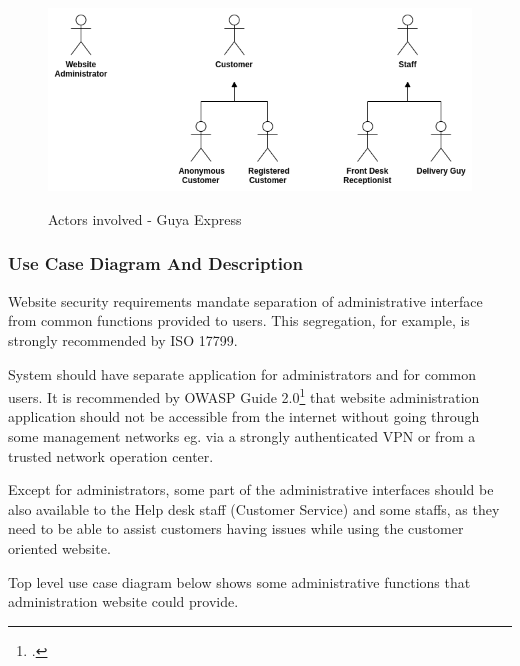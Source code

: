 \begin{figure}[!h]
\includegraphics[width=13cm, keepaspectratio]{images/express_actors}
\label{express_actors}
\caption{Actors involved - Guya Express}
\end{figure}


\subsubsection{Use Case Diagram And Description}
Website security requirements mandate separation of administrative interface from common functions provided to users. This segregation, for example, is strongly recommended by ISO 17799.

System should have separate application for administrators and for common users. It is recommended by OWASP Guide 2.0\footcite{https://www.owasp.org} that website administration application should not be accessible from  the internet without going through some management networks eg. via a strongly authenticated VPN or from a trusted network operation center.

Except for administrators, some part of the administrative interfaces should be also available to the Help desk staff (Customer Service) and some staffs, as they need to be able to assist customers having issues while using the customer oriented website.

Top level use case diagram below shows some administrative functions that administration website could provide.

